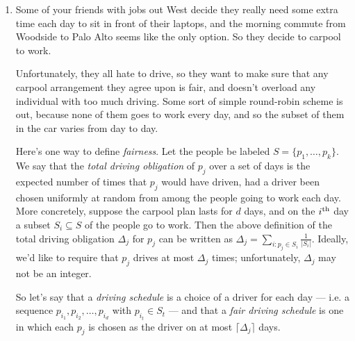 \documentclass[12pt]{article}
\newcommand{\cel}[1]{
{\lceil {#1} \rceil}
}
\begin{document}
\begin{enumerate}
{}


\item

Some of your friends with jobs out West
decide they really need some extra time
each day to sit in front of their laptops,
and the morning commute from Woodside to
Palo Alto seems like the only option.
So they decide to carpool to work.

Unfortunately, they all hate to drive,
so they want to make sure that any
carpool arrangement they agree upon is fair,
and doesn't overload any individual with too much driving.
Some sort of simple round-robin scheme is out,
because none of them goes to work every day,
and so the subset of them in the car
varies from day to day.

Here's one way to define {\em fairness}.
Let the people be labeled $S = \{p_1, \ldots, p_k\}$.
We say that the {\em total driving obligation}
of $p_j$ over a set of days
is the expected number of times that
$p_j$ would have driven, had a driver been
chosen uniformly at random from among
the people going to work each day.
More concretely,
suppose the carpool plan lasts for $d$ days, and on the
$i^{\rm th}$ day a subset $S_i \subseteq S$ of the
people go to work.
Then the above definition of the total
driving obligation $\Delta_j$ for $p_j$ can be written as
$\Delta_j = \sum_{i: p_j \in S_i} \frac{1}{|S_i|}$.
Ideally, we'd like to require that
$p_j$ drives at most $\Delta_j$ times;
unfortunately, $\Delta_j$ may not be an integer.

So let's say that a {\em driving schedule} is
a choice of a driver for each day ---
i.e. a sequence $p_{i_1}, p_{i_2}, \ldots, p_{i_d}$
with $p_{i_t} \in S_t$ ---
and that a {\em fair driving schedule}
is one in which each $p_j$ is chosen as
the driver on at most $\cel{\Delta_j}$ days.


\end{enumerate}
\end{document}
